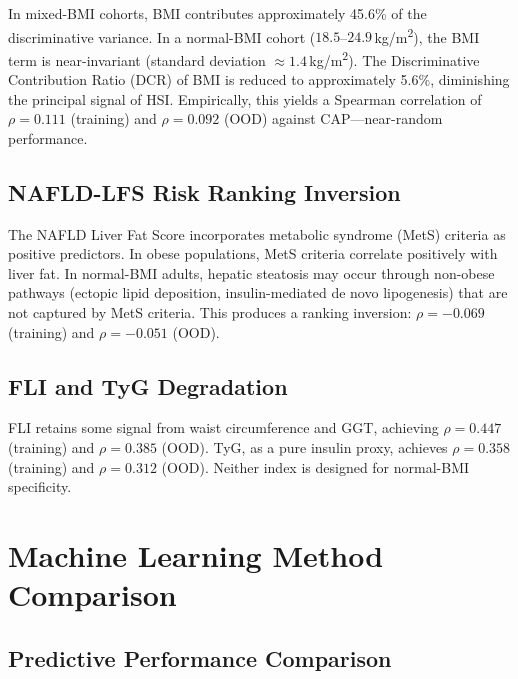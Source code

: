 \documentclass[12pt,a4paper,oneside]{report}
\begin{document}
In mixed-BMI cohorts, BMI contributes approximately 45.6\% of the discriminative variance. In a normal-BMI cohort ($18.5$--$24.9$\,kg/m\textsuperscript{2}), the BMI term is near-invariant (standard deviation $\approx 1.4$\,kg/m\textsuperscript{2}). The Discriminative Contribution Ratio (DCR) of BMI is reduced to approximately 5.6\%, diminishing the principal signal of HSI. Empirically, this yields a Spearman correlation of $\rho = 0.111$ (training) and $\rho = 0.092$ (OOD) against CAP---near-random performance.

\subsection{NAFLD-LFS Risk Ranking Inversion}

The NAFLD Liver Fat Score incorporates metabolic syndrome (MetS) criteria as positive predictors. In obese populations, MetS criteria correlate positively with liver fat. In normal-BMI adults, hepatic steatosis may occur through non-obese pathways (ectopic lipid deposition, insulin-mediated de novo lipogenesis) that are not captured by MetS criteria. This produces a ranking inversion: $\rho = -0.069$ (training) and $\rho = -0.051$ (OOD).

\subsection{FLI and TyG Degradation}

FLI retains some signal from waist circumference and GGT, achieving $\rho = 0.447$ (training) and $\rho = 0.385$ (OOD). TyG, as a pure insulin proxy, achieves $\rho = 0.358$ (training) and $\rho = 0.312$ (OOD). Neither index is designed for normal-BMI specificity.

\section{Machine Learning Method Comparison}

\subsection{Predictive Performance Comparison}
\end{document}
